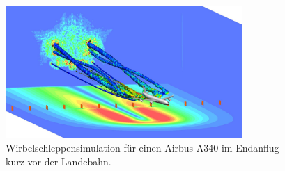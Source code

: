 \begin{figure}
\centering
\includegraphics[width=0.8\textwidth]{papers/wirbelringe/fig/wirbelschleppen_in_der_simulation.jpg}
\caption{Wirbelschleppensimulation für einen Airbus A340 im Endanflug kurz vor der Landebahn. 
\cite{Wirbelringe:wirbelschleppen_in_der_simulation} \label{buch:papers:Wirbelringe:fig:wirbelschleppen_in_der_simulation}}
\end{figure}